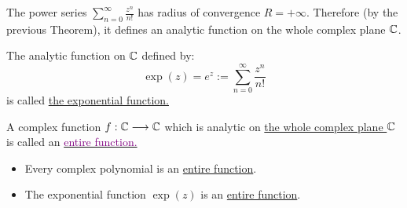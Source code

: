 \begin{example}
The power series $\sum_{n=0}^{\infty} \frac{z^n }{n!}$ has 
radius of convergence $R = +\infty  $. Therefore (by the previous Theorem), it defines an analytic function on the whole complex plane $\mathbb{C}  $. 
\end{example}
\begin{definition}[]
The analytic function on $\mathbb{C}  $ defined by: 
\[
\exp{(z) }  = e^{z} := \sum_{n=0}^{\infty} \frac{z^n }{n!}
\]
is called \underline{the exponential function.}
\end{definition}
\begin{definition}
  A complex function $ f : \mathbb{C}  \longrightarrow \mathbb{C}  $ which
  is analytic on \underline{the whole complex plane $\mathbb{C}  $} is called 
  an \underline{\textcolor{purple}{entire function.}}
\end{definition}
\begin{example}
  \begin{itemize}
    \item[\ding{172}] Every complex 
      polynomial is an \underline{entire function}.
    \item[\ding{173}] The exponential 
      function $\exp (z)    $ is an 
      \underline{entire function}.
  \end{itemize}
\end{example}
